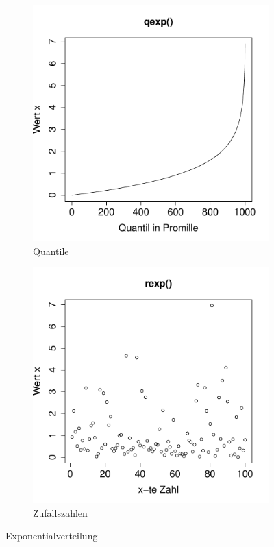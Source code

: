 \begin{figure}[h!]
\begin{subfigure}[b]{0.48\textwidth}
\includegraphics{verteilungen-083}
\caption{Quantile}
\end{subfigure}
\begin{subfigure}[b]{0.48\textwidth}
\includegraphics{verteilungen-084}
\caption{Zufallszahlen}
\end{subfigure}
\caption{Exponentialverteilung}
\label{fig:exp}
\end{figure}

